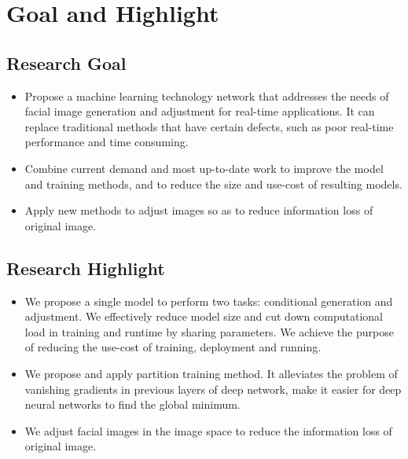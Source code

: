 \section{Goal and Highlight}

\subsection{Research Goal}
\begin{itemize}
\item
Propose a machine learning technology network that addresses the needs of facial image generation and adjustment for real-time applications.
It can replace traditional methods that have certain defects, such as poor real-time performance and time consuming.
\item
Combine current demand and most up-to-date work to improve the model and training methods,
    and to reduce the size and use-cost of resulting models.
\item
Apply new methods to adjust images so as to reduce information loss of original image.
\end{itemize}
\subsection{Research Highlight}
\begin{itemize}
\item
We propose a single model to perform two tasks: conditional generation and adjustment.
We effectively reduce model size and cut down computational load in training and runtime by sharing parameters.
We achieve the purpose of reducing the use-cost of training, deployment and running.
\item
We propose and apply partition training method.
It alleviates the problem of vanishing gradients in previous layers of deep network,
    make it easier for deep neural networks to find the global minimum.

\item
We adjust facial images in the image space to reduce the information loss of original image.
\end{itemize}